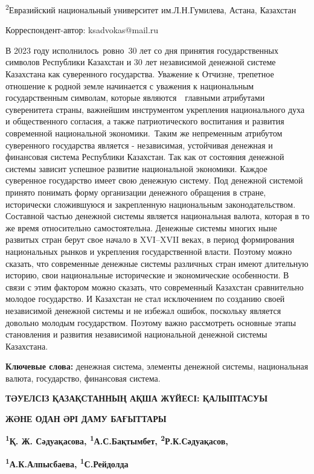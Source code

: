 \textsuperscript{2}Евразийский национальный университет им.Л.Н.Гумилева,
Астана, Казахстан

Корреспондент-автор: ksadvokas@mail.ru

В 2023 году исполнилось~ровно~30 лет со дня принятия государственных
символов Республики Казахстан и 30 лет независимой денежной системе
Казахстана как суверенного государства. Уважение к Отчизне, трепетное
отношение к родной земле начинается с уважения к национальным
государственным символам, которые являются~~главными атрибутами
суверенитета страны, важнейшим инструментом укрепления национального
духа и общественного согласия, а также патриотического воспитания и
развития современной национальной экономики.~Таким же непременным
атрибутом суверенного государства является - независимая, устойчивая
денежная и финансовая система Республики Казахстан. Так как от состояния
денежной системы зависит успешное развитие национальной экономики.
Каждое суверенное государство имеет свою денежную систему. Под денежной
системой принято понимать форму организации денежного обращения в
стране, исторически сложившуюся и закрепленную национальным
законодательством. Составной частью денежной системы является
национальная валюта, которая в то же время относительно самостоятельна.
Денежные системы многих ныне развитых стран берут свое начало в
XVI--XVII веках, в период формирования национальных рынков и укрепления
государственной власти. Поэтому можно сказать, что современные денежные
системы различных стран имеют длительную историю, свои национальные
исторические и экономические особенности. В связи с этим фактором можно
сказать, что современный Казахстан сравнительно молодое государство. И
Казахстан не стал исключением по созданию своей независимой денежной
системы и не избежал ошибок, поскольку является довольно молодым
государством. Поэтому важно рассмотреть основные этапы становления и
развития независимой национальной денежной системы Казахстана.

{\bfseries Ключевые слова:} денежная система, элементы денежной системы,
национальная валюта, государство, финансовая система.

{\bfseries ТӘУЕЛСІЗ ҚАЗАҚСТАННЫҢ АҚША ЖҮЙЕСІ: ҚАЛЫПТАСУЫ}

{\bfseries ЖӘНЕ ОДАН ӘРІ ДАМУ БАҒЫТТАРЫ}

{\bfseries \textsuperscript{1}Қ. Ж. Сәдуақасова,
\textsuperscript{1}А.С.Бақтымбет, \textsuperscript{2}Р.К.Сәдуақасов,}

{\bfseries \textsuperscript{1}А.К.Алпысбаева,
\textsuperscript{1}С.Рейдолда}


